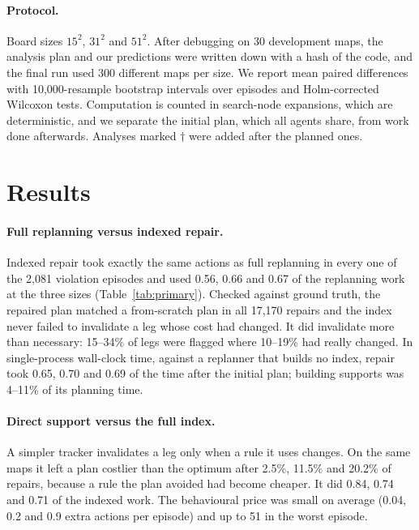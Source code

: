 \documentclass[letterpaper]{article}
\begin{document}
\paragraph{Protocol.} Board sizes $15^2$, $31^2$ and $51^2$. After debugging on 30 development maps, the analysis plan and our predictions were written down with a hash of the code, and the final run used 300 different maps per size. We report mean paired differences with 10,000-resample bootstrap intervals over episodes and Holm-corrected Wilcoxon tests. Computation is counted in search-node expansions, which are deterministic, and we separate the initial plan, which all agents share, from work done afterwards. Analyses marked $\dagger$ were added after the planned ones.

\section{Results}

\begin{table}[t]
\centering
\small

\caption{Comparisons on 300 held-out maps per board size. Brackets are 95\% paired-bootstrap intervals over episodes; resampling maps instead widens them slightly and changes no sign. Negative favours the first-named agent. ``Work'' is search-node expansions and ``time'' is wall-clock, both after the initial plan. Rows marked $\dagger$ were not pre-specified.}
\label{tab:primary}
\end{table}

\paragraph{Full replanning versus indexed repair.} Indexed repair took exactly the same actions as full replanning in every one of the 2,081 violation episodes and used 0.56, 0.66 and 0.67 of the replanning work at the three sizes (Table~\ref{tab:primary}). Checked against ground truth, the repaired plan matched a from-scratch plan in all 17,170 repairs and the index never failed to invalidate a leg whose cost had changed. It did invalidate more than necessary: 15--34\% of legs were flagged where 10--19\% had really changed. In single-process wall-clock time, against a replanner that builds no index, repair took 0.65, 0.70 and 0.69 of the time after the initial plan; building supports was 4--11\% of its planning time.

\paragraph{Direct support versus the full index.} A simpler tracker invalidates a leg only when a rule it uses changes. On the same maps it left a plan costlier than the optimum after 2.5\%, 11.5\% and 20.2\% of repairs, because a rule the plan avoided had become cheaper. It did 0.84, 0.74 and 0.71 of the indexed work. The behavioural price was small on average (0.04, 0.2 and 0.9 extra actions per episode) and up to 51 in the worst episode.
\end{document}
